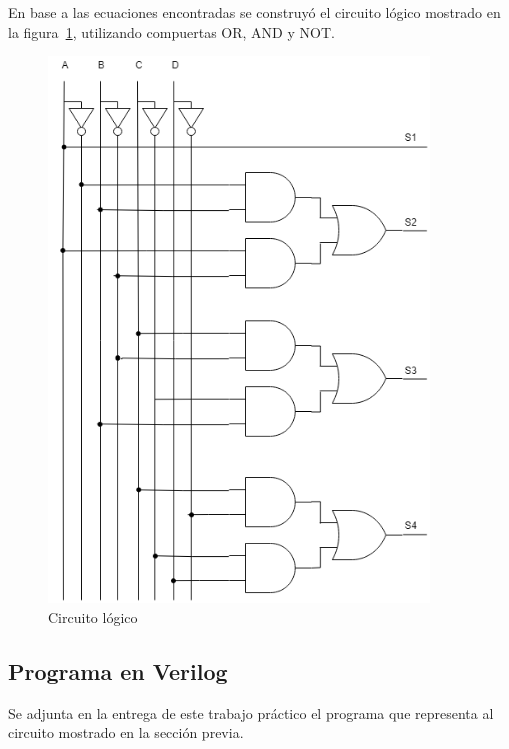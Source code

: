 En base a las ecuaciones encontradas se construy\'o el circuito l\'ogico mostrado en la figura~\ref{fig:ej4_circuito_logico}, utilizando compuertas \textsc{OR}, \textsc{AND} y \textsc{NOT}.

\begin{figure}[H]
    \centering
    \includegraphics[width=0.9\textwidth]{./EJ_4/EJ4_TP1_Electro3.png}
    \caption{Circuito l\'ogico}
    \label{fig:ej4_circuito_logico}
\end{figure}

\subsection{Programa en Verilog}
Se adjunta en la entrega de este trabajo pr\'actico el programa que representa al circuito mostrado en la secci\'on previa. 